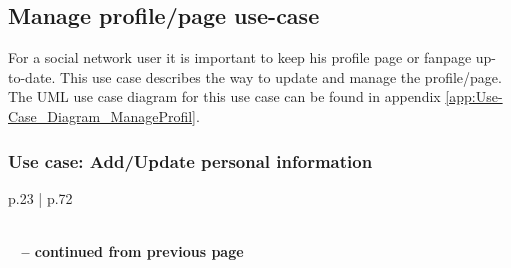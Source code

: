 \documentclass[11pt,a4paper]{report}
\begin{document}
\subsection{Manage profile/page use-case}
For a social network user it is important to keep his profile page or fanpage up-to-date. This use case describes the way to update and manage the profile/page. The UML use case diagram for this use case can be found in appendix \vref{app:Use-Case_Diagram_ManageProfil}.

\subsubsection{Use case: Add/Update personal information}

\begin{longtable}{p{} | p{}}
    \caption{Use case: Add/Update personal information} \label{tab:ucUpdateProfile} \\
    \endfirsthead
        {{\bfseries \tablename\ \thetable{} -- continued from previous page}} \\
         \\
    \endhead
         \\ 
    \endfoot
    \endlastfoot
    

\end{longtable}
\end{document}

